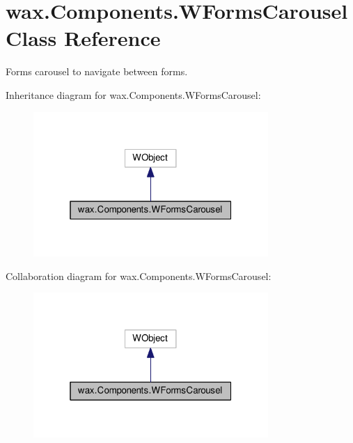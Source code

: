\hypertarget{classwax_1_1Components_1_1WFormsCarousel}{}\section{wax.\+Components.\+W\+Forms\+Carousel Class Reference}
\label{classwax_1_1Components_1_1WFormsCarousel}


Forms carousel to navigate between forms.  




Inheritance diagram for wax.\+Components.\+W\+Forms\+Carousel\+:\nopagebreak
\begin{figure}[H]
\begin{center}
\leavevmode
\includegraphics[width=253pt]{classwax_1_1Components_1_1WFormsCarousel__inherit__graph}
\end{center}
\end{figure}


Collaboration diagram for wax.\+Components.\+W\+Forms\+Carousel\+:\nopagebreak
\begin{figure}[H]
\begin{center}
\leavevmode
\includegraphics[width=253pt]{classwax_1_1Components_1_1WFormsCarousel__coll__graph}
\end{center}
\end{figure}
